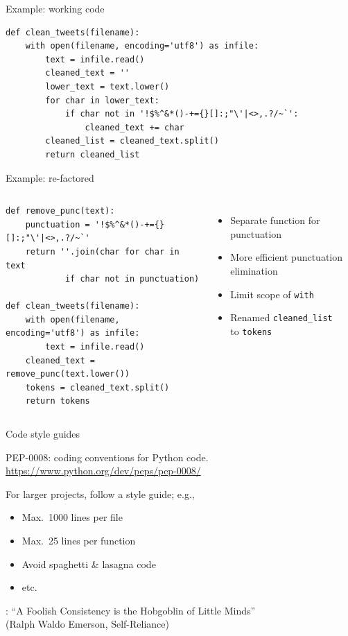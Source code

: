 \documentclass[aspectratio=169,usenames,dvipsnames]{beamer}
\begin{document}
\begin{frame}[fragile]{Example: working code}
\begin{lstlisting}
def clean_tweets(filename):
    with open(filename, encoding='utf8') as infile:
        text = infile.read()
        cleaned_text = ''
        lower_text = text.lower()
        for char in lower_text:
            if char not in '!$%^&*()-+={}[]:;"\'|<>,.?/~`':
                cleaned_text += char
        cleaned_list = cleaned_text.split()
        return cleaned_list
\end{lstlisting}
\end{frame}

\begin{frame}[fragile]{Example: re-factored}
\begin{columns}
\begin{lstlisting}[style=smaller]
def remove_punc(text):
    punctuation = '!$%^&*()-+={}[]:;"\'|<>,.?/~`'
    return ''.join(char for char in text
            if char not in punctuation)

def clean_tweets(filename):
    with open(filename, encoding='utf8') as infile:
        text = infile.read()
    cleaned_text = remove_punc(text.lower())
    tokens = cleaned_text.split()
    return tokens
\end{lstlisting}
\begin{itemize}
\item Separate function for punctuation
\item More efficient punctuation elimination
\item Limit scope of \lstinline{with}
\item Renamed \lstinline{cleaned_list} \\
    to \lstinline{tokens}
\end{itemize}
\end{columns}
\end{frame}

\begin{frame}{Code style guides}
    \begin{reference}
        PEP-0008: coding conventions for Python code.
        \url{https://www.python.org/dev/peps/pep-0008/}
    \end{reference}

    For larger projects, follow a style guide; e.g.,
    \begin{itemize}
        \item Max.\ 1000 lines per file
        \item Max.\ 25 lines per function
        \item Avoid spaghetti \& lasagna code
        \item etc.
    \end{itemize}
   
    \vspace{1em}
    :
        ``A Foolish Consistency is the Hobgoblin of Little Minds'' \\
        (Ralph Waldo Emerson, Self-Reliance)
\end{frame}
\end{document}
